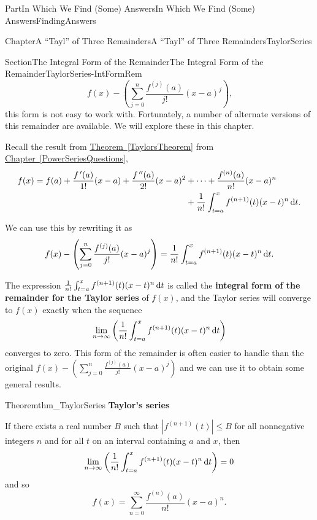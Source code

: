 \documentclass[oneside,10pt,]{book}
\newcommand{\xreffont}{\relax}
\newcommand{\terminology}[1]{\textbf{#1}}
\numberwithin{equation}{part}
\newcommand{\dx}[1]{\,{\rm d}#1}
\def\limit#1#2#3{{\displaystyle\lim_{#1\rightarrow #2}#3}}
\newcommand{\amp}{&}
\begin{document}
\begin{partptx}{Part}{In Which We Find (Some) Answers}{}{In Which We Find (Some) Answers}{}{}{FindingAnswers}
\begin{chapterptx}{Chapter}{A ``Tayl'' of Three Remainders}{}{A ``Tayl'' of Three Remainders}{}{}{TaylorSeries}
\begin{sectionptx}{Section}{The Integral Form of the Remainder}{}{The Integral Form of the Remainder}{}{}{TaylorSeries-IntFormRem}
\begin{equation*}
f(x)-\left(\sum_{j=0}^n\frac{f^{(j)}(a)}{j!}(x-a)^j\right)\text{,}
\end{equation*}
this form is not easy to work with. Fortunately, a number of alternate versions of this remainder are available. We will explore these in this chapter.%
\par
Recall the result from \hyperref[TaylorsTheorem]{Theorem~{\xreffont\ref{TaylorsTheorem}}} from \hyperref[PowerSeriesQuestions]{Chapter~{\xreffont\ref{PowerSeriesQuestions}}},%
\begin{align*}
f(x)=f(a)+\frac{f^{\,\prime}(a)}{1!}(x-a)+\frac{f^{\,\prime\prime}(a)}{2!}(x-a)^2\amp +\cdots+\frac{f^{(n)}(a)}{n!}(x-a)^n\\
\amp +\frac{1}{n!}\int_{t=a}^xf^{(n+1)}(t)(x-t)^n\dx{ t}\text{.}
\end{align*}
%
\par
We can use this by rewriting it as%
\begin{equation*}
f(x)-\left(\sum_{j=0}^n\frac{f^{(j)}(a)}{j!}(x-a)^j\right)=\frac{1}{n!}\int_{t=a}^xf^{(n+1)}(t)(x-t)^n\dx{ t}\text{.}
\end{equation*}
%
\par
The expression \(\frac{1}{n!}\int_{t=a}^xf^{(n+1)}(t)(x-t)^n\dx{ t}\) is called the \terminology{integral form of the remainder for the Taylor series} of \(f(x)\), and the Taylor series will converge to \(f(x)\) exactly when the sequence%
\begin{equation*}
\limit{n}{\infty}{\left(\frac{1}{n!}\int_{t=a}^xf^{(n+1)}(t)(x-t)^n\dx{t}  \right)}
\end{equation*}
converges to zero. This form of the remainder is often easier to handle than the original \(f(x)-\left(\sum_{j=0}^n\frac{f^{(j)}(a)}{j!}(x-a)^j\right)\) and we can use it to obtain some general results.%
\begin{theorem}{Theorem}{}{}{thm_TaylorSeries}%
\terminology{Taylor's series}%
\par
{} If there exists a real number \(B\) such that \(|f^{(n+1)}(t)|\leq B\) for all nonnegative integers \(n\) and for all \(t\) on an interval containing \(a\) and \(x\), then%
\begin{equation*}
\lim_{n\rightarrow\infty}\left(\frac{1}{n!}\int_{t=a}^xf^{(n+1)}(t)(x-t)^n\dx{ t}\right)=0
\end{equation*}
and so%
\begin{equation*}
f(x)=\sum_{n=0}^\infty\frac{f^{(n)}(a)}{n!}(x-a)^n.{}
\end{equation*}
%
\end{theorem}

\end{sectionptx}
\end{chapterptx}
\end{partptx}
\end{document}
